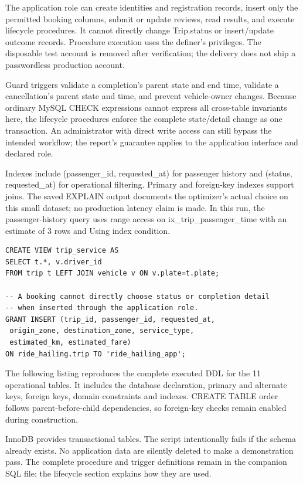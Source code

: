 \documentclass[11pt,a4paper]{article}
\begin{document}
The application role can create identities and registration records, insert only the permitted booking columns, submit or update reviews, read results, and execute lifecycle procedures. It cannot directly change Trip.status or insert/update outcome records. Procedure execution uses the definer's privileges. The disposable test account is removed after verification; the delivery does not ship a passwordless production account.

Guard triggers validate a completion's parent state and end time, validate a cancellation's parent state and time, and prevent vehicle-owner changes. Because ordinary MySQL CHECK expressions cannot express all cross-table invariants here, the lifecycle procedures enforce the complete state/detail change as one transaction. An administrator with direct write access can still bypass the intended workflow; the report's guarantee applies to the application interface and declared role.

Indexes include (passenger\_\allowbreak{}id, requested\_\allowbreak{}at) for passenger history and (status, requested\_\allowbreak{}at) for operational filtering. Primary and foreign-key indexes support joins. The saved EXPLAIN output documents the optimizer's actual choice on this small dataset; no production latency claim is made. In this run, the passenger-history query uses range access on ix\_\allowbreak{}trip\_\allowbreak{}passenger\_\allowbreak{}time with an estimate of 3 rows and Using index condition.

\begin{lstlisting}
CREATE VIEW trip_service AS
SELECT t.*, v.driver_id
FROM trip t LEFT JOIN vehicle v ON v.plate=t.plate;

-- A booking cannot directly choose status or completion detail
-- when inserted through the application role.
GRANT INSERT (trip_id, passenger_id, requested_at,
 origin_zone, destination_zone, service_type,
 estimated_km, estimated_fare)
ON ride_hailing.trip TO 'ride_hailing_app';
\end{lstlisting}

The following listing reproduces the complete executed DDL for the 11 operational tables. It includes the database declaration, primary and alternate keys, foreign keys, domain constraints and indexes. CREATE TABLE order follows parent-before-child dependencies, so foreign-key checks remain enabled during construction.

InnoDB provides transactional tables. The script intentionally fails if the schema already exists. No application data are silently deleted to make a demonstration pass. The complete procedure and trigger definitions remain in the companion SQL file; the lifecycle section explains how they are used.
\end{document}
